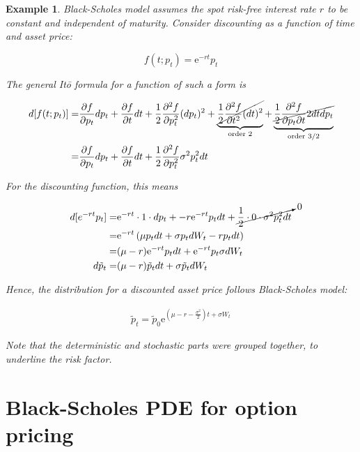 \documentclass[oneside,titlepage,headinclude,12pt,a4paper,BCOR5mm,footinclude]{book}
\theoremstyle{defn}
\newtheorem{example}{Example}
\newcommand{\eexp}{\mathrm{e}}
\begin{document}
\begin{example}
  Black-Scholes model assumes the \textit{spot risk-free interest rate} $r$ to
  be constant and independent of  maturity. Consider \textit{discounting} as a
  function of time and asset price:

  \[
    f(t;p_t) = \eexp^{-rt}p_t
  \]

  The general It\=o formula for a function of such a form is

  \begin{align*}
    d[f(t;p_t)] = & 
      \frac{\partial f}{\partial p_t} dp_t + 
      \frac{\partial f}{\partial t} dt + 
      \frac{1}{2} \frac{\partial^2 f}{\partial p_t^2} (dp_t)^2 +
      \underbrace{\cancel{\frac{1}{2} \frac{\partial^2 f}{\partial t^2} (dt)^2}}_\text{order 2} +
      \underbrace{\cancel{\frac{1}{2} \frac{\partial^2 f}{\partial p_t \partial t} 2dtdp_t}}_\text{order 3/2}
      \\
      = & 
      \frac{\partial f}{\partial p_t} dp_t + 
      \frac{\partial f}{\partial t} dt + 
      \frac{1}{2} \frac{\partial^2 f}{\partial p_t^2} \sigma^2 p_t^2dt
  \end{align*}

  For the discounting function, this means

  \begin{align*}
    d[e^{-rt}p_t] = & \eexp^{-rt} \cdot 1 \cdot dp_t + -r\eexp^{-rt}p_tdt +
      \cancelto{0}{\frac{1}{2} \cdot 0 \cdot \sigma^2 p_t^2 dt}
      \\
      = & \eexp^{-rt}\left( \mu p_t dt + \sigma p_t dW_t -r p_t dt \right)
      \\
      = & (\mu - r) \eexp^{-rt} p_tdt + \eexp^{-rt} p_t\sigma dW_t
      \\
    d\tilde{p}_t = & (\mu - r)\tilde{p}_tdt + \sigma \tilde{p}_t dW_t
  \end{align*}

  Hence, the distribution for a discounted asset price follows Black-Scholes model:

  \begin{align*}
    \tilde{p}_t = \tilde{p}_0 \eexp^{(\mu - r - \frac{\sigma^2}{2})t + \sigma W_t}
  \end{align*}

  Note that the  deterministic and stochastic parts were  grouped together, to
  underline the \textit{risk factor}.
\end{example}

\section{Black-Scholes PDE for option pricing} 
\end{document}
